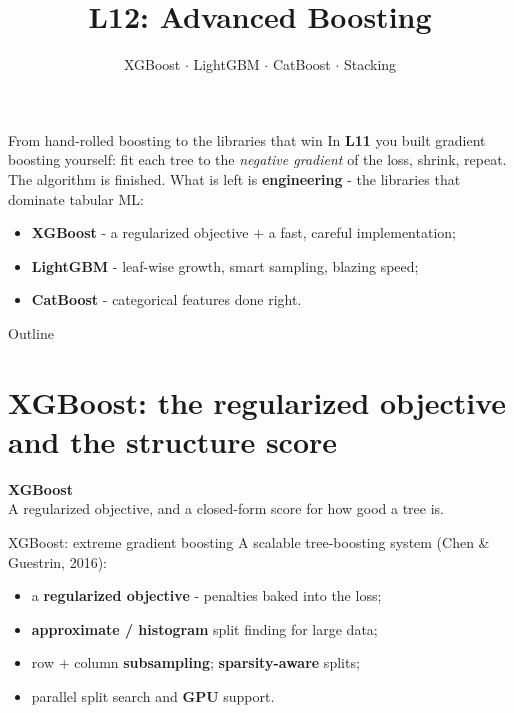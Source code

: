 \documentclass[aspectratio=169]{beamer}
\title{L12: Advanced Boosting}
\subtitle{XGBoost $\cdot$ LightGBM $\cdot$ CatBoost $\cdot$ Stacking}
\date{}
\newcommand{\sectiontransition}[2]{%
  \begin{frame}[plain]
    \vfill
    \begin{center}
      {\Large\color{popblue}\textbf{#1}}\\[10pt]
      {\normalsize #2}
    \end{center}
    \vfill
  \end{frame}}
\begin{document}
\begin{frame}{From hand-rolled boosting to the libraries that win}
  In \textbf{L11} you built gradient boosting yourself: fit each tree to the \emph{negative
  gradient} of the loss, shrink, repeat. The algorithm is finished.
  \vskip 6pt
  What is left is \textbf{engineering} - the libraries that dominate tabular ML:
  \begin{itemize}
    \item \textbf{XGBoost} - a regularized objective $+$ a fast, careful implementation;
    \item \textbf{LightGBM} - leaf-wise growth, smart sampling, blazing speed;
    \item \textbf{CatBoost} - categorical features done right.
  \end{itemize}
  \vfill
\end{frame}

\begin{frame}{Outline}
  \tableofcontents
\end{frame}

\section{XGBoost: the regularized objective and the structure score}
\sectiontransition{XGBoost}{A regularized objective, and a closed-form score for how good a tree is.}

\begin{frame}{XGBoost: extreme gradient boosting}
  A scalable tree-boosting system (Chen \& Guestrin, 2016):
  \begin{itemize}
    \item a \textbf{regularized objective} - penalties baked into the loss;
    \item \textbf{approximate / histogram} split finding for large data;
    \item row $+$ column \textbf{subsampling}; \textbf{sparsity-aware} splits;
    \item parallel split search and \textbf{GPU} support.
  \end{itemize}
  \vfill
\end{frame}
\end{document}
